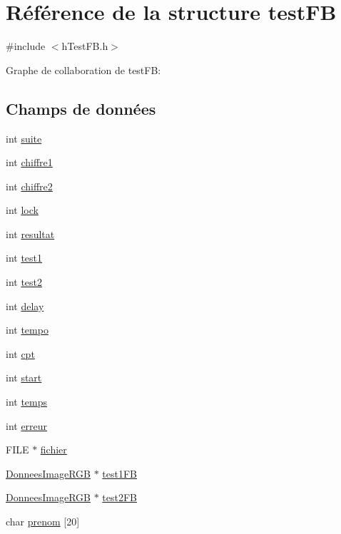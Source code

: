 \hypertarget{structtest_f_b}{}\section{Référence de la structure test\+FB}
\label{structtest_f_b}


{\ttfamily \#include $<$h\+Test\+F\+B.\+h$>$}



Graphe de collaboration de test\+FB\+:
\subsection*{Champs de données}
\begin{DoxyCompactItemize}
\item 
int \hyperlink{structtest_f_b_a514b694eb0819995854779f7f7fc2422}{suite}
\item 
int \hyperlink{structtest_f_b_a356f4fce8c2f522fd08f4c45a5f59570}{chiffre1}
\item 
int \hyperlink{structtest_f_b_a993aa24e718fb4568cd55d88feecb851}{chiffre2}
\item 
int \hyperlink{structtest_f_b_ae5894b1b7d2f0cd2fdbef84240db5110}{lock}
\item 
int \hyperlink{structtest_f_b_a44413d12389c0a742dbe1e0df4c104cc}{resultat}
\item 
int \hyperlink{structtest_f_b_afa42eb35c54a2f27711057c5ef41237a}{test1}
\item 
int \hyperlink{structtest_f_b_a8f0856b06ab5e0822da706e8ed6f6e6e}{test2}
\item 
int \hyperlink{structtest_f_b_afce45aec2fc30e60d9261d5f5a3975d5}{delay}
\item 
int \hyperlink{structtest_f_b_ac9594af7975494d3f8c232458f72ee38}{tempo}
\item 
int \hyperlink{structtest_f_b_aa9a520b6a87fe214467f1ab30e4cab53}{cpt}
\item 
int \hyperlink{structtest_f_b_aac9d3e0a5715c139234b32c99674b7f5}{start}
\item 
int \hyperlink{structtest_f_b_a083d19395309503e328224aa35646a8e}{temps}
\item 
int \hyperlink{structtest_f_b_ae27714bfada1c6176b1af512491dbd00}{erreur}
\item 
F\+I\+LE $\ast$ \hyperlink{structtest_f_b_a01c630238bb34a5c67ef08ece202b178}{fichier}
\item 
\hyperlink{struct_donnees_image_r_g_b}{Donnees\+Image\+R\+GB} $\ast$ \hyperlink{structtest_f_b_aa30ded6b44a96238652680412a3c2f75}{test1\+FB}
\item 
\hyperlink{struct_donnees_image_r_g_b}{Donnees\+Image\+R\+GB} $\ast$ \hyperlink{structtest_f_b_a42c97c44463c946d8112f72736bb2fc5}{test2\+FB}
\item 
char \hyperlink{structtest_f_b_abc1010cb9ea68c3a6f4198c8f5cc8446}{prenom} \mbox{[}20\mbox{]}
\end{DoxyCompactItemize}



